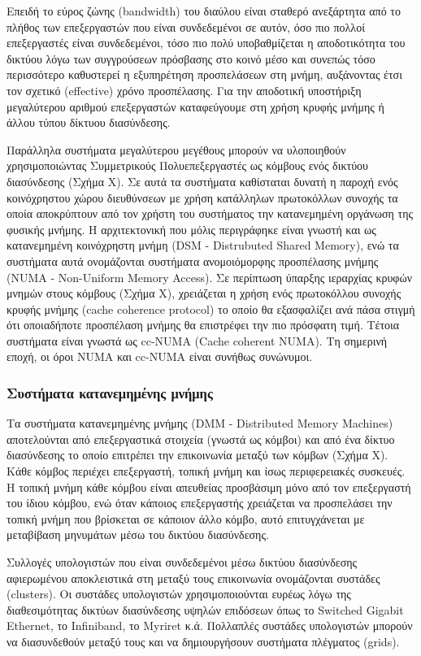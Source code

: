 Επειδή το εύρος ζώνης (bandwidth) του διαύλου είναι σταθερό ανεξάρτητα από το πλήθος των επεξεργαστών που είναι συνδεδεμένοι σε αυτόν, όσο πιο πολλοί επεξεργαστές είναι συνδεδεμένοι, τόσο πιο πολύ υποβαθμίζεται η αποδοτικότητα του δικτύου λόγω των συγγρούσεων πρόσβασης στο κοινό μέσο και συνεπώς τόσο περισσότερο καθυστερεί η εξυπηρέτηση προσπελάσεων στη μνήμη, αυξάνοντας έτσι τον σχετικό (effective) χρόνο προσπέλασης. Για την αποδοτική υποστήριξη μεγαλύτερου αριθμού επεξεργαστών καταφεύγουμε στη χρήση κρυφής μνήμης ή άλλου τύπου δίκτυου διασύνδεσης.

Παράλληλα συστήματα μεγαλύτερου μεγέθους μπορούν να υλοποιηθούν χρησιμοποιώντας Συμμετρικούς Πολυεπεξεργαστές ως κόμβους ενός δικτύου διασύνδεσης (Σχήμα Χ). Σε αυτά τα συστήματα καθίσταται δυνατή η παροχή ενός κοινόχρηστου χώρου διευθύνσεων με χρήση κατάλληλων πρωτοκόλλων συνοχής τα οποία αποκρύπτουν από τον χρήστη του συστήματος την κατανεμημένη οργάνωση της φυσικής μνήμης. Η αρχιτεκτονική που μόλις περιγράφηκε είναι γνωστή και ως κατανεμημένη κοινόχρηστη μνήμη (DSM - Distrubuted Shared Memory), ενώ τα συστήματα αυτά ονομάζονται συστήματα ανομοιόμορφης προσπέλασης μνήμης (NUMA - Non-Uniform Memory Access). Σε περίπτωση ύπαρξης ιεραρχίας κρυφών μνημών στους κόμβους (Σχήμα Χ), χρειάζεται η χρήση ενός πρωτοκόλλου συνοχής κρυφής μνήμης (cache coherence protocol) το οποίο θα εξασφαλίζει ανά πάσα στιγμή ότι οποιαδήποτε προσπέλαση μνήμης θα επιστρέφει την πιο πρόσφατη τιμή. Τέτοια συστήματα είναι γνωστά ως cc-NUMA (Cache coherent NUMA). Τη σημερινή εποχή, οι όροι NUMA και cc-NUMA είναι συνήθως συνώνυμοι.

\subsubsection{Συστήματα κατανεμημένης μνήμης}
Τα συστήματα κατανεμημένης μνήμης (DMM - Distributed Memory Machines) αποτελούνται από επεξεργαστικά στοιχεία (γνωστά ως κόμβοι) και από ένα δίκτυο διασύνδεσης το οποίο επιτρέπει την επικοινωνία μεταξύ των κόμβων (Σχήμα Χ). Κάθε κόμβος περιέχει επεξεργαστή, τοπική μνήμη και ίσως περιφερειακές συσκευές. Η τοπική μνήμη κάθε κόμβου είναι απευθείας προσβάσιμη μόνο από τον επεξεργαστή του ίδιου κόμβου, ενώ όταν κάποιος επεξεργαστής χρειάζεται να προσπελάσει την τοπική μνήμη που βρίσκεται σε κάποιον άλλο κόμβο, αυτό επιτυγχάνεται με μεταβίβαση μηνυμάτων μέσω του δικτύου διασύνδεσης. 

Συλλογές υπολογιστών που είναι συνδεδεμένοι μέσω δικτύου διασύνδεσης αφιερωμένου αποκλειστικά στη μεταξύ τους επικοινωνία ονομάζονται συστάδες (clusters). Οι συστάδες υπολογιστών χρησιμοποιούνται ευρέως λόγω της διαθεσιμότητας δικτύων διασύνδεσης υψηλών επιδόσεων όπως το Switched Gigabit Ethernet, το Infiniband, το Myriret κ.ά. Πολλαπλές συστάδες υπολογιστών μπορούν να διασυνδεθούν μεταξύ τους και να δημιουργήσουν συστήματα πλέγματος (grids).

